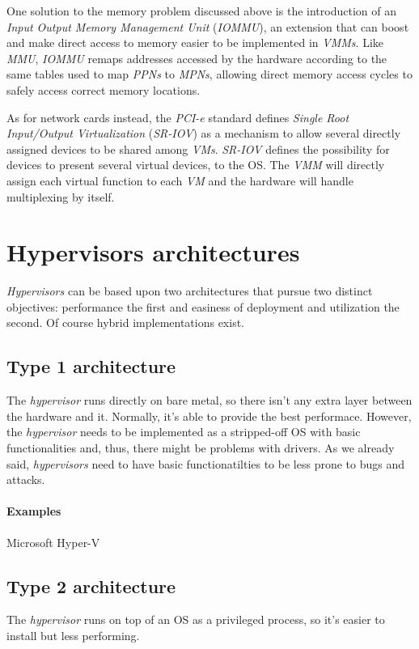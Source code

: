 \noindent
One solution to the memory problem discussed above
is the introduction of an \emph{Input Output Memory Management Unit}
(\emph{IOMMU}), an extension that can boost and make direct access to memory
easier to be implemented in \emph{VMMs}. Like \emph{MMU}, \emph{IOMMU}
remaps addresses accessed by the hardware according to the same tables used
to map \emph{PPNs} to \emph{MPNs}, allowing direct memory access cycles to
safely access correct memory locations.

As for network cards instead, the \emph{PCI-e} standard defines
\emph{Single Root Input/Output Virtualization} (\emph{SR-IOV}) as a mechanism
to allow several directly assigned devices to be shared among \emph{VMs}.
\emph{SR-IOV} defines the possibility for devices to present several virtual
devices,  to the OS. The \emph{VMM} will directly assign each
virtual function to each \emph{VM} and the hardware will handle multiplexing by
itself.

\section{Hypervisors architectures}
\emph{Hypervisors} can be based upon two architectures that pursue two
distinct objectives: performance the first and easiness of deployment
and utilization the second. Of course hybrid implementations exist.

\subsection{Type 1 architecture}
The \emph{hypervisor} runs directly on bare metal, so there isn't any extra
layer between the hardware and it. Normally, it's able to provide the best
performace. However, the \emph{hypervisor} needs to be implemented as a
stripped-off OS with basic functionalities and, thus, there might be problems
with drivers. As we already said, \emph{hypervisors} need to have basic
functionatilties to be less prone to bugs and attacks.

\paragraph{Examples} Microsoft Hyper-V

\subsection{Type 2 architecture}
The \emph{hypervisor} runs on top of an OS as a privileged process, so it's
easier to install but less performing.

